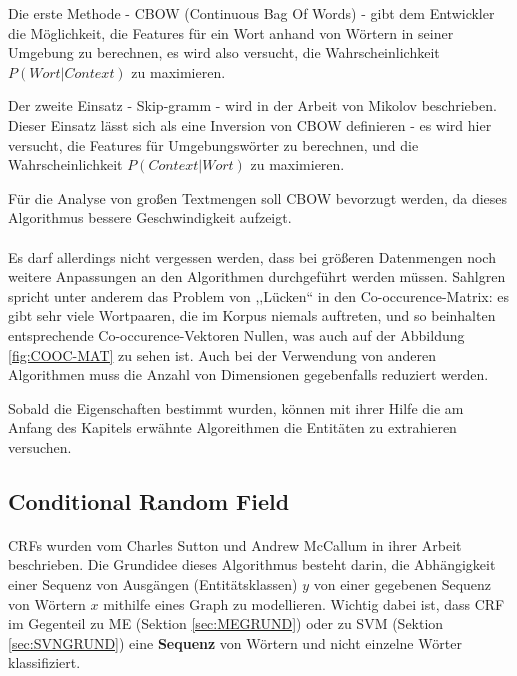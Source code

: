 Die erste Methode - CBOW (Continuous Bag Of Words\cite{garcia2014word}) - gibt dem Entwickler die Möglichkeit, die Features für ein Wort anhand von Wörtern in seiner Umgebung zu berechnen, es wird also versucht, die Wahrscheinlichkeit $P(Wort|Context)$ zu maximieren.

Der zweite Einsatz - Skip-gramm - wird in der Arbeit von Mikolov\cite{mikolov2013distributed} beschrieben. Dieser Einsatz lässt sich als eine Inversion von CBOW  definieren - es wird hier versucht, die Features für Umgebungswörter zu berechnen, und die Wahrscheinlichkeit $P(Context|Wort)$ zu maximieren.

Für die Analyse von großen Textmengen soll CBOW bevorzugt werden, da dieses Algorithmus bessere Geschwindigkeit aufzeigt\cite{wang2014introduction}. 

\paragraph{}
Es darf allerdings nicht vergessen werden, dass bei größeren Datenmengen noch weitere Anpassungen an den Algorithmen durchgeführt werden müssen. Sahlgren\cite{sahlgren2006word} spricht unter anderem das Problem von ,,Lücken`` in den Co-occurence-Matrix: es gibt sehr viele Wortpaaren, die im Korpus niemals auftreten, und so beinhalten entsprechende Co-occurence-Vektoren Nullen, was auch auf der Abbildung \ref{fig:COOC-MAT} zu sehen ist. Auch bei der Verwendung von anderen Algorithmen muss die Anzahl von Dimensionen gegebenfalls reduziert werden.  

Sobald die Eigenschaften bestimmt wurden, können mit ihrer Hilfe die am Anfang des Kapitels erwähnte Algoreithmen die Entitäten zu extrahieren versuchen.

\subsection{Conditional Random Field} \label{subsec:crftheory}
\paragraph{}
CRFs wurden vom Charles Sutton und Andrew McCallum in ihrer Arbeit\cite{Charles/Andrew:10} beschrieben. Die Grundidee dieses Algorithmus besteht darin, die Abhängigkeit einer Sequenz von Ausgängen (Entitätsklassen) $y$ von einer gegebenen Sequenz von Wörtern $x$ mithilfe eines Graph zu modellieren. Wichtig dabei ist, dass CRF im Gegenteil zu ME (Sektion \ref{sec:MEGRUND}) oder zu SVM (Sektion \ref{sec:SVNGRUND}) eine \textbf{Sequenz} von Wörtern und nicht einzelne Wörter klassifiziert\cite{rossler2007korpus}.

